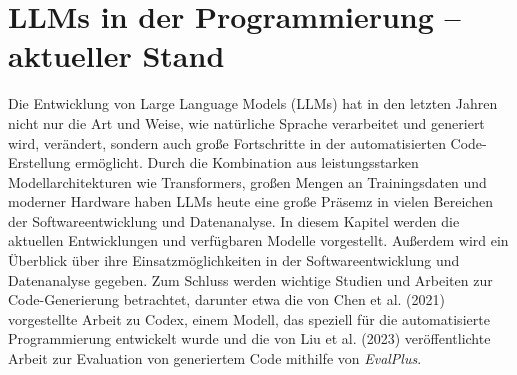 \documentclass[11pt,a4paper]{article}
\begin{document}
\section{LLMs in der Programmierung – aktueller Stand}
\label{sec:llms_programmierung}
Die Entwicklung von Large Language Models (LLMs) hat in den letzten Jahren nicht nur die Art und Weise, wie natürliche Sprache verarbeitet und generiert wird, verändert, sondern auch große Fortschritte in der automatisierten Code-Erstellung ermöglicht. Durch die Kombination aus leistungsstarken Modellarchitekturen wie Transformers, großen Mengen an Trainingsdaten und moderner Hardware haben LLMs heute eine große Präsemz in vielen Bereichen der Softwareentwicklung und Datenanalyse.
In diesem Kapitel werden die aktuellen Entwicklungen und verfügbaren Modelle vorgestellt. Außerdem wird ein Überblick über ihre Einsatzmöglichkeiten in der Softwareentwicklung und Datenanalyse gegeben. Zum Schluss werden wichtige Studien und Arbeiten zur Code-Generierung betrachtet, darunter etwa die von Chen et al. (2021) vorgestellte Arbeit zu Codex, einem Modell, das speziell für die automatisierte Programmierung entwickelt wurde\cite{chen2021evaluatinglargelanguagemodels} und die von Liu et al. (2023) veröffentlichte Arbeit zur Evaluation von generiertem Code mithilfe von \emph{EvalPlus}\cite{NEURIPS2023_43e9d647}.
\end{document}
